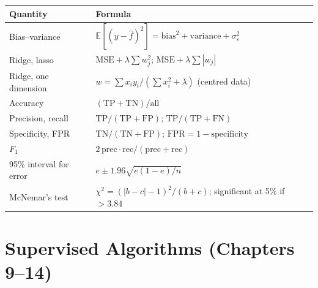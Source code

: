 \begin{longtable}{@{}L{4.0cm}L{11.0cm}@{}}
\toprule
{}
\textbf{Quantity} & \textbf{Formula} \\
\midrule
\endhead
Bias--variance & $\mathbb{E}[(y - \hat{f})^2] = \text{bias}^2 + \text{variance} + \sigma^2_{\varepsilon}$ \\
Ridge, lasso & $\text{MSE} + \lambda\sum w_j^2$; \quad $\text{MSE} + \lambda\sum|w_j|$ \\
Ridge, one dimension & $w = \sum x_i y_i / (\sum x_i^2 + \lambda)$ \quad (centred data) \\
Accuracy & $(\text{TP} + \text{TN})/\text{all}$ \\
Precision, recall & $\text{TP}/(\text{TP} + \text{FP})$; \quad $\text{TP}/(\text{TP} + \text{FN})$ \\
Specificity, FPR & $\text{TN}/(\text{TN} + \text{FP})$; \quad $\text{FPR} = 1 - \text{specificity}$ \\
$F_1$ & $2\,\text{prec}\cdot\text{rec}/(\text{prec} + \text{rec})$ \\
95\% interval for error & $e \pm 1.96\sqrt{e(1 - e)/n}$ \\
McNemar's test & $\chi^2 = (|b - c| - 1)^2/(b + c)$; significant at 5\% if $> 3.84$ \\
\bottomrule
\end{longtable}

\section{Supervised Algorithms (Chapters 9--14)}

